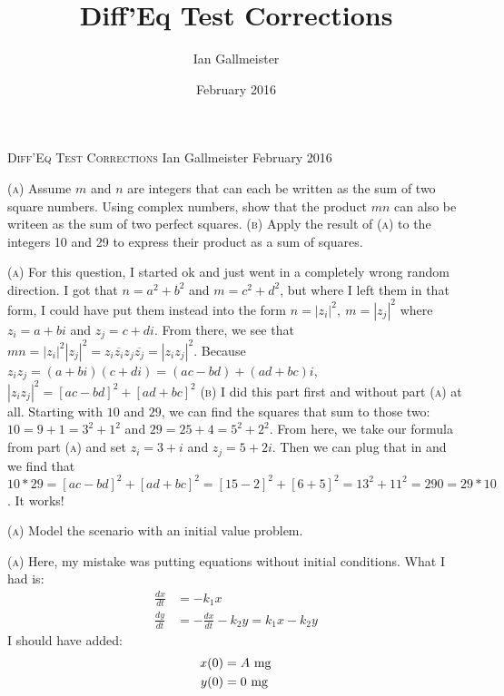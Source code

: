 \documentclass{article}
\title{Diff'Eq Test Corrections}
\author{Ian Gallmeister}
\date{February 2016}
\begin{document}
\Large
\textsc{Diff'Eq Test Corrections}
\newline \normalsize Ian Gallmeister
\newline February 2016


\newline \textsc{(a)} Assume $m$ and $n$ are integers that can each be written as the sum of two square numbers.  Using complex numbers, show that the product $mn$ can also be writeen as the sum of two perfect squares.
\newline\textsc{(b)} Apply the result of \textsc{(a)} to the integers 10 and 29 to express their product as a sum of squares.

\hangindent=20pt
\vspace{10pt}
\newline\textsc{(a)} For this question, I started ok and just went in a completely wrong random direction.  I got that $n = a^2 + b^2$ and $m = c^2 + d^2$, but where I left them in that form, I could have put them instead into the form $n = |z_i|^2, \: m = |z_j|^2$ where $z_i = a + bi$ and $z_j = c + di$.  From there, we see that $mn = |z_i|^2|z_j|^2 = z_i\overline{z_i}z_j\overline{z_j} = |z_iz_j|^2$.  Because $z_iz_j = (a+ bi)(c+di) = (ac - bd) + (ad + bc)i$, $|z_iz_j|^2 = [ac - bd]^2 + [ad + bc]^2$
\newline\textsc{(b)} I did this part first and without part \textsc{(a)} at all.  Starting with $10$ and $29$, we can find the squares that sum to those two: $10 = 9 + 1 = 3^2 + 1^2$ and $29 = 25 + 4 = 5^2 + 2^2$.  From here, we take our formula from part \textsc{(a)} and set $z_i = 3 + i$ and $z_j = 5 + 2i$.  Then we can plug that in and we find that $10*29 = [ac - bd]^2 + [ad + bc]^2 = [15 - 2]^2 + [6 + 5]^2 = 13^2 + 11^2 = 290 = 29*10$.  It works!


\newline \textsc{(a)} Model the scenario with an initial value problem.

\hangindent=20pt
\vspace{10pt}
\newline\textsc{(a)} Here, my mistake was putting equations without initial conditions.  What I had is:
\begin{align*}
    \frac{dx}{dt} &= -k_1x \\
    \frac{dy}{dt} &= -\frac{dx}{dt} - k_2y = k_1x - k_2y
\end{align*}
I should have added:
\begin{align*}
    x(0) &= A \hbox{ mg}\\
    y(0) &= 0 \hbox{ mg}
\end{align*}

\end{document}
